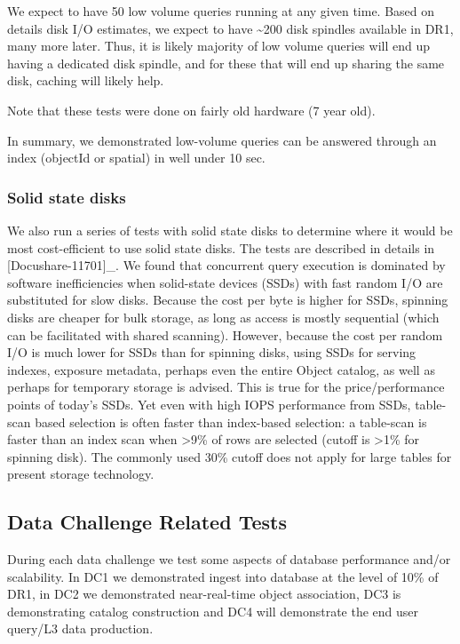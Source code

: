 \documentclass[DM,lsstdraft,toc]{lsstdoc}
\begin{document}
We expect to have 50 low volume queries running at any given time. Based
on details disk I/O estimates, we expect to have \textasciitilde{}200
disk spindles available in DR1, many more later. Thus, it is likely
majority of low volume queries will end up having a dedicated disk
spindle, and for these that will end up sharing the same disk, caching
will likely help.

Note that these tests were done on fairly old hardware (7 year old).

In summary, we demonstrated low-volume queries can be answered through
an index (objectId or spatial) in well under 10 sec.

\subsubsection{Solid state disks}\label{solid-state-disks}

We also run a series of tests with solid state disks to determine where
it would be most cost-efficient to use solid state disks. The tests are
described in details in {[}Docushare-11701{]}\_. We found that
concurrent query execution is dominated by software inefficiencies when
solid-state devices (SSDs) with fast random I/O are substituted for slow
disks. Because the cost per byte is higher for SSDs, spinning disks are
cheaper for bulk storage, as long as access is mostly sequential (which
can be facilitated with shared scanning). However, because the cost per
random I/O is much lower for SSDs than for spinning disks, using SSDs
for serving indexes, exposure metadata, perhaps even the entire Object
catalog, as well as perhaps for temporary storage is advised. This is
true for the price/performance points of today's SSDs. Yet even with
high IOPS performance from SSDs, table-scan based selection is often
faster than index-based selection: a table-scan is faster than an index
scan when \textgreater{}9\% of rows are selected (cutoff is
\textgreater{}1\% for spinning disk). The commonly used 30\% cutoff does
not apply for large tables for present storage technology.

\subsection{Data Challenge Related
Tests}\label{data-challenge-related-tests}

During each data challenge we test some aspects of database performance
and/or scalability. In DC1 we demonstrated ingest into database at the
level of 10\% of DR1, in DC2 we demonstrated near-real-time object
association, DC3 is demonstrating catalog construction and DC4 will
demonstrate the end user query/L3 data production.
\end{document}
